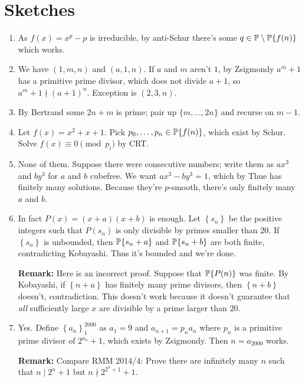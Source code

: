 \documentclass[11pt,paper=letter]{scrartcl}
\newcommand{\seq}[1]{\left\{#1\right\}}
\newcommand{\primeseq}[1]{\PP\!\seq{#1}}
\begin{document}
\pagebreak
\section{Sketches}

\begin{enumerate}

\item As $f(x) = x^p - p$ is irreducible, by anti-Schur there's some $q \in \PP \setminus \primeseq{f(n)}$ which works.

\item We have $(1, m, n)$ and $(a, 1, n)$. If $a$ and $m$ aren't $1$, by Zsigmondy $a^m + 1$ has a primitive prime divisor, which does not divide $a + 1$, so $a^m + 1 \nmid (a + 1)^n$. Exception is $(2, 3, n)$.

\item By Bertrand some $2n + m$ is prime; pair up $\{m, \ldots, 2n\}$ and recurse on $m - 1$.

\item Let $f(x) = x^2 + x + 1$. Pick $p_0, \ldots, p_n \in \primeseq{f(n)}$, which exist by Schur. Solve $f(x) \equiv 0 \pmod{p_i}$ by CRT.

\item None of them. Suppose there were consecutive numbers; write them as $ax^3$ and $by^3$ for $a$ and $b$ cubefree. We want $ax^3 - by^3 = 1$, which by Thue has finitely many solutions. Because they're $p$-smooth, there's only finitely many $a$ and $b$.

\item In fact $P(x) = (x + a)(x + b)$ is enough. Let $\seq{s_n}$ be the positive integers such that $P(s_n)$ is only divisible by primes smaller than $20$. If $\seq{s_n}$ is unbounded, then $\primeseq{s_n + a}$ and $\primeseq{s_n + b}$ are both finite, contradicting Kobayashi. Thus it's bounded and we're done.

\textbf{Remark:} Here is an incorrect proof. Suppose that $\primeseq{P(n)}$ was finite. By Kobayashi, if $\seq{n + a}$ has finitely many prime divisors, then $\seq{n + b}$ doesn't, contradiction. This doesn't work because it doesn't guarantee that \textit{all} sufficiently large $x$ are divisible by a prime larger than $20$.

\item Yes. Define $\seq{a_n}_1^{2000}$ as $a_1 = 9$ and $a_{n + 1} = p_na_n$ where $p_n$ is a primitive prime divisor of $2^{a_n} + 1$, which exists by Zsigmondy. Then $n = a_{2000}$ works.

\textbf{Remark:} Compare RMM 2014/4: Prove there are infinitely many $n$ such that $n \mid 2^n + 1$ but $n \nmid 2^{2^n + 1} + 1$.


\end{enumerate}
\end{document}
